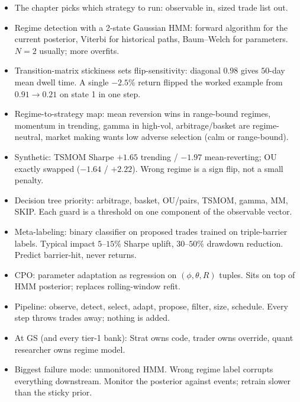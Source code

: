 \begin{itemize}
  \item The chapter picks which strategy to run: observable in,
  sized trade list out.
  \item Regime detection with a 2-state Gaussian HMM: forward
  algorithm for the current posterior, Viterbi for historical
  paths, Baum--Welch for parameters. $N = 2$ usually; more
  overfits.
  \item Transition-matrix stickiness sets flip-sensitivity:
  diagonal $0.98$ gives $50$-day mean dwell time. A single
  $-2.5\%$ return flipped the worked example from $0.91 \to
  0.21$ on state 1 in one step.
  \item Regime-to-strategy map: mean reversion wins in
  range-bound regimes, momentum in trending, gamma in high-vol,
  arbitrage/basket are regime-neutral, market making wants low
  adverse selection (calm or range-bound).
  \item Synthetic: TSMOM Sharpe $+1.65$ trending / $-1.97$
  mean-reverting; OU exactly swapped ($-1.64$ / $+2.22$). Wrong
  regime is a sign flip, not a small penalty.
  \item Decision tree priority: arbitrage, basket, OU/pairs,
  TSMOM, gamma, MM, SKIP. Each guard is a threshold on one
  component of the observable vector.
  \item Meta-labeling: binary classifier on proposed trades
  trained on triple-barrier labels. Typical impact $5$--$15\%$
  Sharpe uplift, $30$--$50\%$ drawdown reduction. Predict
  barrier-hit, never returns.
  \item CPO: parameter adaptation as regression on $(\phi,
  \theta, R)$ tuples. Sits on top of HMM posterior; replaces
  rolling-window refit.
  \item Pipeline: observe, detect, select, adapt, propose,
  filter, size, schedule. Every step throws trades away;
  nothing is added.
  \item At GS (and every tier-1 bank): Strat owns code, trader
  owns override, quant researcher owns regime model.
  \item Biggest failure mode: unmonitored HMM. Wrong regime
  label corrupts everything downstream. Monitor the posterior
  against events; retrain slower than the sticky prior.
\end{itemize}
